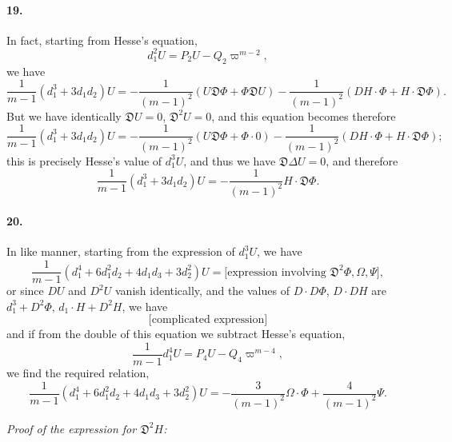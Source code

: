 \documentclass[11pt,a4paper]{book}
\begin{document}
\paragraph{19.}
In  fact,  starting  from  Hesse's  equation,
\[
d_1^2 U = P_2 U - Q_2 \varpi^{m-2},
\]
we   have
\[
\frac{1}{m-1}(d_1^3 + 3d_1 d_2)U = -\frac{1}{(m-1)^2}(U \mathfrak{D} \Phi + \Phi \mathfrak{D} U) - \frac{1}{(m-1)^2}(DH \cdot \Phi + H \cdot \mathfrak{D} \Phi).
\]
But  we  have  identically  $\mathfrak{D} U = 0$,  $\mathfrak{D}^2 U = 0$,  and  this  equation  becomes  therefore
\[
\frac{1}{m-1}(d_1^3 + 3d_1 d_2)U = -\frac{1}{(m-1)^2}(U \mathfrak{D} \Phi + \Phi \cdot 0) - \frac{1}{(m-1)^2}(DH \cdot \Phi + H \cdot \mathfrak{D} \Phi);
\]
this  is  precisely  Hesse's  value  of  $d_1^3 U$,  and  thus  we  have  $\mathfrak{D} \Delta U = 0$,  and  therefore
\[
\frac{1}{m-1}(d_1^3 + 3d_1 d_2)U = -\frac{1}{(m-1)^2} H \cdot \mathfrak{D} \Phi.
\]

\paragraph{20.}
In  like  manner,  starting  from  the  expression  of  $d_1^3 U$,  we  have
\[
\frac{1}{m-1}(d_1^4 + 6d_1^2 d_2 + 4d_1 d_3 + 3d_2^2)U = \text{[expression involving  } \mathfrak{D}^2 \Phi, \Omega, \Psi\text{]},
\]
or    since    $DU$    and    $D^2 U$    vanish    identically,    and    the    values    of    $D \cdot D\Phi$,    $D \cdot DH$    are
$d_1^3 + D^2 \Phi$,  $d_1 \cdot H + D^2 H$,  we  have
\[
\text{[complicated  expression]}
\]
and  if  from  the  double  of  this  equation  we  subtract  Hesse's  equation,
\[
\frac{1}{m-1} d_1^4 U = P_4 U - Q_4 \varpi^{m-4},
\]
we  find  the  required  relation,
\[
\frac{1}{m-1}(d_1^4 + 6d_1^2 d_2 + 4d_1 d_3 + 3d_2^2)U = -\frac{3}{(m-1)^2} \Omega \cdot \Phi + \frac{4}{(m-1)^2} \Psi.
\]

\newpage

\noindent\textit{Proof of the expression for $\mathfrak{D}^2 H$:}
\end{document}
